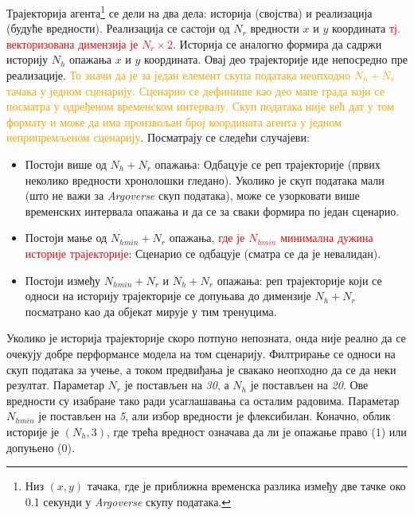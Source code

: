 \documentclass[11pt,oneside]{memoir}
\begin{document}
Трајекторија агента\footnote{Низ $(x, y)$ тачака, где је приближна временска разлика између две тачке око 0.1 секунди у \textit{Argoverse}
скупу података.} 
се дели на два дела: историја (својства) и реализација (будуће вредности). Реализација се састоји од $N_r$ вредности
$x$ и $y$ координата \textcolor{red}{тј. векторизована димензија је $N_r\times 2$}.
Историја се аналогно формира да садржи историју $N_h$ опажања $x$ и $y$ координата. Овај део трајекторије иде непосредно
пре реализације. \textcolor{orange}{То значи да је за један елемент скупа података неопходно $N_h + N_r$ тачака у једном сценарију. 
Сценарио се дефинише као део мапе града који се посматра
у одређеном временском интервалу. Скуп података није већ
дат у том формату и може да има произвољан број координата агента у једном неприпремљеном сценарију}. Посматрају се следећи случајеви:
\begin{itemize}
  \item Постоји више од $N_h + N_r$ опажања: Одбацује се реп трајекторије (првих неколико вредности хронолошки гледано).
        Уколико је скуп података мали (што не важи за \textit{Argoverse} скуп података), може се узорковати више временских интервала
        опажања и да се за сваки формира по један сценарио.
  \item Постоји мање од $N_{hmin} + N_r$ опажања, \textcolor{red}{где је $N_{hmin}$ минимална дужина историје трајекторије}: Сценарио се одбацује (сматра се да је невалидан).
  \item Постоји између $N_{hmin} + N_r$ и $N_h + N_r$ опажања: реп трајекторије који се односи на историју трајекторије 
        се допуњава до димензије $N_h + N_r$ посматрано као да објекат мирује у тим тренуцима.
\end{itemize}
Уколико је историја
трајекторије скоро потпуно непозната, онда није реално да се очекују добре перформансе модела на том сценарију. Филтрирање се
односи на скуп података за учење, а током предвиђања је свакако неопходно да се да неки резултат. Параметар $N_r$ је постављен на \textit{30},
а $N_h$ је постављен на \textit{20}. Ове вредности су изабране тако ради усаглашавања са осталим радовима. Параметар $N_{hmin}$ је
постављен на \textit{5}, али избор вредности је флексибилан. 
Коначно, облик историје је $(N_h, 3)$, где трећа вредност означава да ли је опажање право ($1$) или допуњено ($0$).
\end{document}
